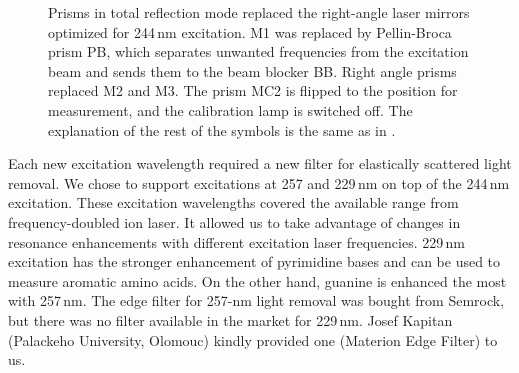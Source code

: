 \begin{figure}
	\centering
	
	\caption[%
		Top-view schema of the apparatus for multiple excitation wavelengths
		and with side-view inset of the sample space.%
	]{%
		Prisms in total reflection mode replaced the right-angle laser mirrors
		optimized for 244\,nm excitation.
		M1 was replaced by Pellin-Broca prism PB, which separates unwanted
		frequencies from the excitation beam and sends them to the beam blocker BB.
		Right angle prisms replaced M2 and M3.
		The prism MC2 is flipped to the position for measurement, and the
		calibration lamp is switched off.
		The explanation of the rest of the symbols is the same as in
		.
	}
	\label{\figlabel{multiple_excitations:apparatus_schema}}
\end{figure}

Each new excitation wavelength required a new filter for elastically scattered
light removal.
We chose to support excitations at 257 and 229\,nm on top of the 244\,nm
excitation.
These excitation wavelengths covered the available range from frequency-doubled
 ion laser.
It allowed us to take advantage of changes in resonance enhancements with
different excitation laser frequencies.
229\,nm excitation has the stronger enhancement of pyrimidine bases and can be
used to measure aromatic amino acids.
On the other hand, guanine is enhanced the most with 257\,nm.
The edge filter for 257-nm light removal was bought from Semrock, but there was
no filter available in the market for 229\,nm.
Josef Kapitan (Palackeho University, Olomouc) kindly provided one (Materion
Edge Filter) to us.
